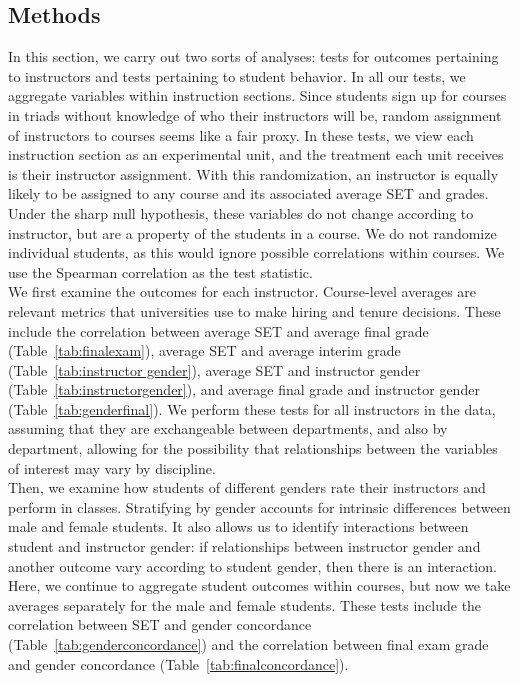 \documentclass[12pt]{article}
\begin{document}
\subsection{Methods}\label{boring:methods}
In this section, we carry out two sorts of analyses: tests for outcomes pertaining to instructors and tests pertaining to student behavior. In all our tests, we aggregate variables within instruction sections.  Since students sign up for courses in triads without knowledge of who their instructors will be, random assignment of instructors to courses seems like a fair proxy.  In these tests, we view each instruction section as an experimental unit, and the treatment each unit receives is their instructor assignment.  With this randomization, an instructor is equally likely to be assigned to any course and its associated average SET and grades.  Under the sharp null hypothesis, these variables do not change according to instructor, but are a property of the students in a course.  We do not randomize individual students, as this would ignore possible correlations within courses.  We use the Spearman correlation as the test statistic.  \\

We first examine the outcomes for each instructor.  Course-level averages are relevant metrics that universities use to make hiring and tenure decisions.  These include the correlation between average SET and average final grade (Table~\ref{tab:finalexam}), average SET and average interim grade (Table~\ref{tab:instructor gender}),  average SET and instructor gender (Table~\ref{tab:instructorgender}), and average final grade and instructor gender (Table~\ref{tab:genderfinal}).  We perform these tests for all instructors in the data, assuming that they are exchangeable between departments, and also by department, allowing for the possibility that relationships between the variables of interest may vary by discipline. \\

Then, we examine how students of different genders rate their instructors and perform in classes.  Stratifying by gender accounts for intrinsic differences between male and female students.  It also allows us to identify interactions between student and instructor gender: if relationships between instructor gender and another outcome vary according to student gender, then there is an interaction.  Here, we continue to aggregate student outcomes within courses, but now we take averages separately for the male and female students.  These tests include the correlation between SET and gender concordance (Table~\ref{tab:genderconcordance}) and the correlation between final exam grade and gender concordance (Table~\ref{tab:finalconcordance}).
\end{document}
